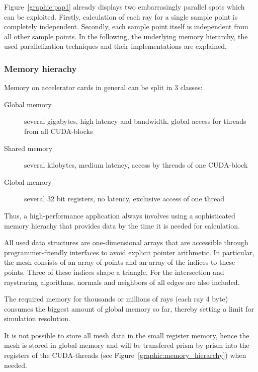 Figure~\ref{graphic:pap1} already displays two embarrasingly parallel spots
which can be exploited. Firstly, calculation of each ray for a single sample
point is completely independent. Secondly, each sample point itself is
independent from all other sample points. 
In the following, the underlying memory hierarchy, the used parallelization
techniques and their implementations are explained.

\subsubsection{Memory hierachy}
Memory on accelerator cards in general can be split
in 3 classes: 
\begin{description}
  \item[Global memory] several gigabytes, high latency and bandwidth, global access for threads from all CUDA-blocks
  \item[Shared memory] several kilobytes, medium latency, access by threads of one CUDA-block
  \item[Global memory] several 32 bit registers, no latency, exclusive access of one thread
\end{description}
Thus, a high-performance application always involves using
a sophisticated memory hierachy that provides data by
the time it is needed for calculation.

All used data structures are one-dimensional 
arrays that are accessible through programmer-friendly interfaces to avoid
explicit pointer arithmetic.
In particular, the mesh consists of an array of points and an array of the indices
to these points. Three of these indices shape a triangle.
For the intersection and raystracing algorithms, normals and neighbors
of all edges are also included. 

The required memory for thousands or millions of rays (each ray 4 byte)
consumes the biggest amount of global memory so far, thereby setting 
a limit for simulation resolution. 

It is not possible to store all mesh data in the small register
memory, hence the mesh is stored in global memory and will
be transfered prism by prism into the registers of the
CUDA-threads (see Figure~\ref{graphic:memory_hierarchy}) when needed.


